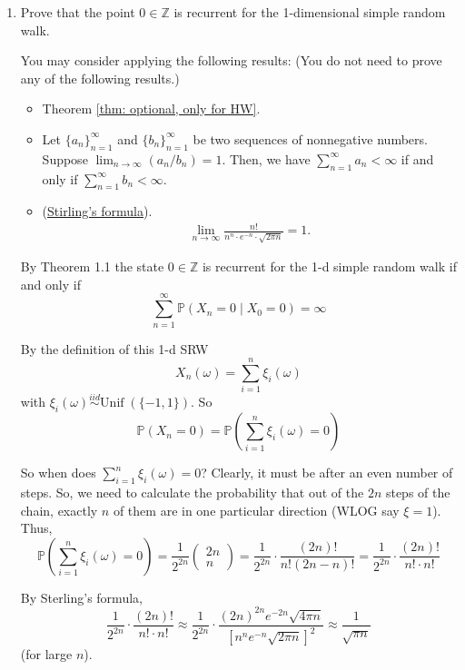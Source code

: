\documentclass[11pt,letterpaper, leqno]{article}
\numberwithin{equation}{section}
\numberwithin{theorem}{section}
\numberwithin{lemma}{section}
\numberwithin{corollary}{section}
\numberwithin{definition}{section}
\numberwithin{proposition}{section}
\numberwithin{remark}{section}
\numberwithin{example}{section}
\newcommand{\Z}{\mathbb{Z}}
\renewcommand{\P}{\mathbb{P}}
\newcommand{\iid}{\overset{iid}{\sim}}
\newcommand{\Unif}{\text{Unif}\;}
\begin{document}
\begin{enumerate}
        \color{black}

    \pagebreak

    \item Prove that the point $0\in\mathbb{Z}$ is recurrent for the 1-dimensional simple random walk.

    You may consider applying the following results: (You do not need to prove any of the following results.)
    \begin{itemize}
        \item Theorem \ref{thm: optional, only for HW}.
        \item Let $\{a_n\}_{n=1}^\infty$ and $\{b_n\}_{n=1}^\infty$ be two sequences of nonnegative numbers. Suppose $\lim_{n\rightarrow\infty}(a_n/b_n)=1$. Then, we have $\sum_{n=1}^\infty a_n<\infty$ if and only if $\sum_{n=1}^\infty b_n<\infty$.
        \item (\href{https://en.wikipedia.org/wiki/Stirlings_approximation}{Stirling's formula}).
        \begin{align*}
            \lim_{n\rightarrow\infty}\frac{n!}{n^n\cdot e^{-n}\cdot\sqrt{2\pi n}} = 1.
        \end{align*}
    \end{itemize}

        \color{blue}
            By Theorem 1.1 the state $0 \in \Z$ is recurrent for the 1-d simple random walk if and only if 
            \[\sum_{n=1}^\infty \P(X_n = 0 \; | \; X_0 = 0) = \infty\]

            By the definition of this 1-d SRW
            \[X_n(\omega) = \sum_{i=1}^n \xi_i(\omega)\]
            with $\xi_i(\omega) \iid \Unif(\{-1, 1\})$. So 
            \[\P(X_n = 0) = \P\left(\sum_{i=1}^n \xi_i(\omega) = 0\right) \]
           
            So when does $\sum_{i=1}^n \xi_i(\omega) = 0$? Clearly, it must be after an even number of steps. So, we need to calculate the probability that out of the $2n$ steps of the chain, exactly $n$ of them are in one particular direction (WLOG say $\xi = 1$). Thus, 
            \[\P\left(\sum_{i=1}^n \xi_i(\omega) = 0\right) = \frac{1}{2^{2n}} \begin{pmatrix}
                2n\\n
            \end{pmatrix} = \frac{1}{2^{2n}} \cdot \frac{(2n)!}{n! (2n-n)!} = \frac{1}{2^{2n}} \cdot \frac{(2n)!}{n! \cdot n!}\]

            By Sterling's formula, 
            \[\frac{1}{2^{2n}} \cdot \frac{(2n)!}{n! \cdot n!} \approx \frac{1}{2^{2n}} \cdot \frac{(2n)^{2n} e^{-2n} \sqrt{4\pi n}}{[n^n e^{-n}\sqrt{2\pi n}]^2} \approx \frac{1}{\sqrt{\pi n}}\]
            (for large $n$). 


\end{enumerate}
\end{document}
